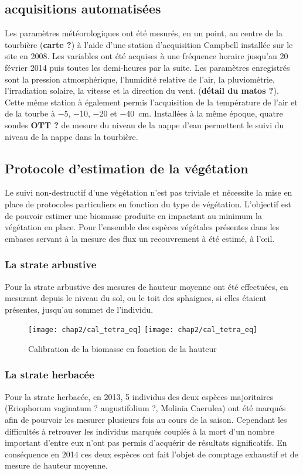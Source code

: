 \subsection{acquisitions automatisées}

Les paramètres météorologiques ont été mesurés, en un point, au centre de la tourbière (\textbf{carte ?}) à l'aide d'une station d'acquisition Campbell installée sur le site en 2008.
Les variables ont été acquises à une fréquence horaire jusqu'au 20 février 2014 puis toutes les demi-heures par la suite. 
Les paramètres enregistrés sont la pression atmosphérique, l'humidité relative de l'air, la pluviométrie, l'irradiation solaire, la vitesse et la direction du vent. (\textbf{détail du matos ?}).
Cette même station à également permis l'acquisition de la température de l'air et de la tourbe à \num{-5}, \num{-10}, \num{-20} et \SIlist{-40}{\cm}.
Installées à la même époque, quatre sondes \textbf{OTT ?} de mesure du niveau de la nappe d'eau permettent le suivi du niveau de la nappe dans la tourbière.

\subsection{Protocole d'estimation de la végétation}

Le suivi non-destructif d'une végétation n'est pas triviale et nécessite la mise en place de protocoles particuliers en fonction du type de végétation.
L'objectif est de pouvoir estimer une biomasse produite en impactant au minimum la végétation en place.
Pour l'ensemble des espèces végétales présentes dans les embases servant à la mesure des flux un recouvrement à été estimé, à l’œil.


\subsubsection{La strate arbustive}
Pour la strate arbustive des mesures de hauteur moyenne ont été effectuées, en mesurant depuis le niveau du sol, ou le toit des sphaignes, si elles étaient présentes, jusqu'au sommet de l'individu.
\begin{figure}
\texttt{[image: chap2/cal\_tetra\_eq]}
\texttt{[image: chap2/cal\_tetra\_eq]}
\caption{Calibration de la biomasse en fonction de la hauteur}
\label{fig:cal_arbu}
\end{figure}

\subsubsection{La strate herbacée}
Pour la strate herbacée, en 2013, 5 individus des deux espèces majoritaires (Eriophorum vaginatum ? augustifolium ?, Molinia Caerulea) ont été marqués afin de pourvoir les mesurer plusieurs fois au cours de la saison.
Cependant les difficultés à retrouver les individus marqués couplés à la mort d'un nombre important d'entre eux n'ont pas permis d'acquérir de résultats significatifs.
En conséquence en 2014 ces deux espèces ont fait l'objet de comptage exhaustif et de mesure de hauteur moyenne.


